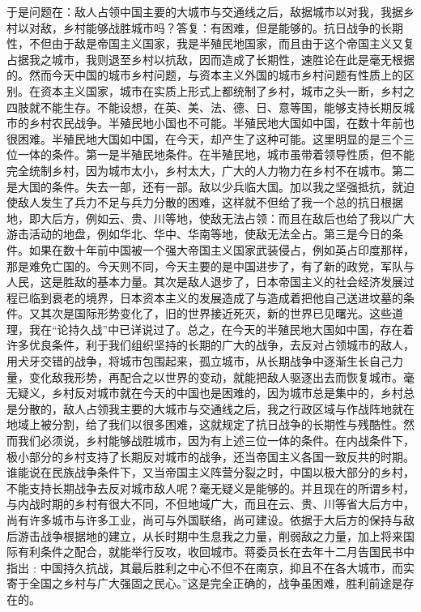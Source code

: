 \documentclass[UTF8, 12pt, a4paper]{ctexrep}
\begin{document}
于是问题在：敌人占领中国主要的大城市与交通线之后，敌据城市以对我，我据乡村以对敌，乡村能够战胜城市吗？答复：有困难，但是能够的。抗日战争的长期性，不但由于敌是帝国主义国家，我是半殖民地国家，而且由于这个帝国主义又复占据我之城市，我则退至乡村以抗敌，因而造成了长期性，速胜论在此是毫无根据的。然而今天中国的城市乡村问题，与资本主义外国的城市乡村问题有性质上的区别。在资本主义国家，城市在实质上形式上都统制了乡村，城市之头一断，乡村之四肢就不能生存。不能设想，在英、美、法、德、日、意等国，能够支持长期反城市的乡村农民战争。半殖民地小国也不可能。半殖民地大国如中国，在数十年前也很困难。半殖民地大国如中国，在今天，却产生了这种可能。这里明显的是三个三位一体的条件。第一是半殖民地条件。在半殖民地，城市虽带着领导性质，但不能完全统制乡村，因为城市太小，乡村太大，广大的人力物力在乡村不在城市。第二是大国的条件。失去一部，还有一部。敌以少兵临大国。加以我之坚强抵抗，就迫使敌人发生了兵力不足与兵力分散的困难，这样就不但给了我一个总的抗日根据地，即大后方，例如云、贵、川等地，使敌无法占领：而且在敌后也给了我以广大游击活动的地盘，例如华北、华中、华南等地，使敌无法全占。第三是今日的条件。如果在数十年前中国被一个强大帝国主义国家武装侵占，例如英占印度那样，那是难免亡国的。今天则不同，今天主要的是中国进步了，有了新的政党，军队与人民，这是胜敌的基本力量。其次是敌人退步了，日本帝国主义的社会经济发展过程已临到衰老的境界，日本资本主义的发展造成了与造成着把他自己送进坟墓的条件。又其次是国际形势变化了，旧的世界接近死灭，新的世界已见曙光。这些道理，我在“论持久战”中已详说过了。总之，在今天的半殖民地大国如中国，存在着许多优良条件，利于我们组织坚持的长期的广大的战争，去反对占领城市的敌人，用犬牙交错的战争，将城市包围起来，孤立城市，从长期战争中逐渐生长自己力量，变化敌我形势，再配合之以世界的变动，就能把敌人驱逐出去而恢复城市。毫无疑义，乡村反对城市就在今天的中国也是困难的，因为城市总是集中的，乡村总是分散的，敌人占领我主要的大城市与交通线之后，我之行政区域与作战阵地就在地域上被分割，给了我们以很多困难，这就规定了抗日战争的长期性与残酷性。然而我们必须说，乡村能够战胜城市，因为有上述三位一体的条件。在内战条件下，极小部分的乡村支持了长期反对城市的战争，还当帝国主义各国一致反共的时期。谁能说在民族战争条件下，又当帝国主义阵营分裂之时，中国以极大部分的乡村，不能支持长期战争去反对城市敌人呢？毫无疑义是能够的。并且现在的所谓乡村，与内战时期的乡村有很大不同，不但地域广大，而且在云、贵、川等省大后方中，尚有许多城市与许多工业，尚可与外国联络，尚可建设。依据于大后方的保持与敌后游击战争根据地的建立，从长时期中生息我之力量，削弱敌之力量，加上将来国际有利条件之配合，就能举行反攻，收回城市。蒋委员长在去年十二月告国民书中指出﹕中国持久抗战，其最后胜利之中心不但不在南京，抑且不在各大城市，而实寄于全国之乡村与广大强固之民心。”这是完全正确的，战争虽困难，胜利前途是存在的。
\end{document}
